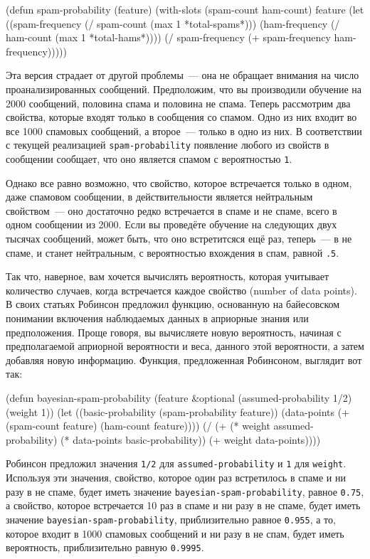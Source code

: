 \begin{myverb}
(defun spam-probability (feature)
  (with-slots (spam-count ham-count) feature
    (let ((spam-frequency (/ spam-count (max 1 *total-spams*)))
          (ham-frequency (/ ham-count (max 1 *total-hams*))))
      (/ spam-frequency (+ spam-frequency ham-frequency)))))
\end{myverb}

Эта версия страдает от другой проблемы~--- она не обращает внимания на число
проанализированных сообщений.  Предположим, что вы производили обучение на 2000 сообщений,
половина спама и половина не спама.  Теперь рассмотрим два свойства, которые входят только
в сообщения со спамом.  Одно из них входит во все 1000 спамовых сообщений, а второе~---
только в одно из них.  В соответствии с текущей реализацией \lstinline{spam-probability}
появление любого из свойств в сообщении сообщает, что оно является спамом с вероятностью
\lstinline{1}.

Однако все равно возможно, что свойство, которое встречается только в одном, даже
спамовом сообщении, в действительности является нейтральным свойством~--- оно достаточно
редко встречается в спаме и не спаме, всего в одном сообщении из 2000.  Если вы проведёте
обучение на следующих двух тысячах сообщений, может быть, что оно встретитсяся ещё раз,
теперь~--- в не спаме, и станет нейтральным, с вероятностью вхождения в спам, равной
\lstinline{.5}.

Так что, наверное, вам хочется вычислять вероятность, которая учитывает количество
случаев, когда встречается каждое свойство (number of data points).  В своих статьях
Робинсон предложил функцию, основанную на байесовском понимании включения наблюдаемых
данных в априорные знания или предположения. Проще говоря, вы вычисляете новую вероятность,
начиная с предполагаемой априорной вероятности и веса, данного этой вероятности, а затем
добавляя новую информацию. Функция, предложенная Робинсоном, выглядит вот так:

\begin{myverb}
(defun bayesian-spam-probability (feature &optional
                                  (assumed-probability 1/2)
                                  (weight 1))
  (let ((basic-probability (spam-probability feature))
        (data-points (+ (spam-count feature) (ham-count feature))))
    (/ (+ (* weight assumed-probability)
          (* data-points basic-probability))
       (+ weight data-points))))
\end{myverb}

Робинсон предложил значения \lstinline{1/2} для \lstinline{assumed-probability} и \lstinline{1} для
\lstinline{weight}.  Используя эти значения, свойство, которое один раз встретилось в спаме и
ни разу в не спаме, будет иметь значение \lstinline{bayesian-spam-probability}, равное
\lstinline{0.75}, а свойство, которое встречается 10 раз в спаме и ни разу в не спаме, будет
иметь значение \lstinline{bayesian-spam-probability}, приблизительно равное \lstinline{0.955}, а то,
которое входит в 1000 спамовых сообщений и ни разу в не спам, будет иметь вероятность,
приблизительно равную \lstinline{0.9995}.

